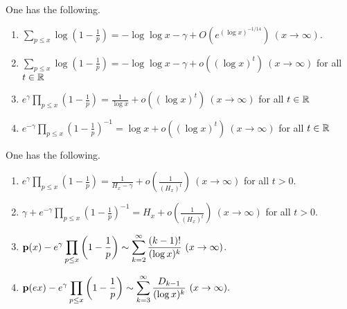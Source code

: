 \documentclass[12pt]{article}
\begin{document}
\begin{proposition}\label{mertensprop}
One has the following.
\begin{enumerate}
\item  $\displaystyle \sum_{p \leq x}\log \left(1-\frac{1}{p}\right) = -\log \log x - \gamma + O \left(e^{(\log x)^{-1/14}} \right) \ (x \to \infty).$
\item  $\displaystyle \sum_{p \leq x}\log \left(1-\frac{1}{p}\right) = -\log \log x - \gamma + o ((\log x)^t) \  (x \to \infty)$ for all $t \in {\mathbb R}$
\item $\displaystyle e^{\gamma} \prod_{p \leq x}\left(1-\frac{1}{p}\right)  =  \frac{1}{\log x}+  o ((\log x)^t) \  (x \to \infty)$ for all $t \in {\mathbb R}$
\item $\displaystyle e^{-\gamma} \prod_{p \leq x}\left(1-\frac{1}{p}\right)^{-1}  =  \log x +  o ((\log x)^t) \  (x \to \infty)$ for all $t \in {\mathbb R}$
\end{enumerate}
\end{proposition}

\begin{corollary}
One has the following.
\begin{enumerate}
\item  $\displaystyle e^{\gamma} \prod_{p \leq x}\left(1-\frac{1}{p}\right)  =  \frac{1}{H_x-\gamma}+ o \left( \frac{1}{(H_x)^{t}} \right) \ (x \to \infty)$ for all $t > 0$.
\item $\gamma+ \displaystyle e^{-\gamma} \prod_{p \leq x}\left(1-\frac{1}{p}\right)^{-1}  =  H_x  + o \left( \frac{1}{(H_x)^{t}} \right) \ (x \to \infty)$ for all $t > 0$.
\item $\displaystyle {\mathbf p}(x) - e^{\gamma} \prod_{p \leq x}\left(1-\frac{1}{p}\right)  \sim  \sum_{k = 2}^\infty \frac{(k-1)!}{(\log x)^k} \ (x \to \infty)$.
\item $\displaystyle {\mathbf p}(ex) - e^{\gamma} \prod_{p \leq x}\left(1-\frac{1}{p}\right)  \sim  \sum_{k = 3}^\infty \frac{D_{k-1}}{(\log x)^k} \ (x \to \infty).$
\end{enumerate}
\end{corollary}
\end{document}
